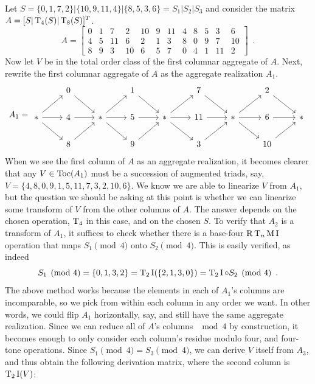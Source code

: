 \begin{example}
    \cite[224]{Starr1984}
    Let $S = \{ 0, 1, 7, 2 \} | \{ 10, 9, 11, 4 \} | \{ 8, 5, 3, 6 \} = S_1 | S_2 | S_3$ and consider the matrix $A = [S | \operatorname{T}_4(S) | \operatorname{T}_8(S)]^T$.
    \begin{equation}
        A = \left[
        \begin{array}{cccc|cccc|cccc}
        	0 & 1 & 7 & 2 & 10 & 9 & 11 & 4 & 8 & 5 & 3 & 6 \\
        	4 & 5 & 11 & 6 & 2 & 1 & 3 & 8 & 0 & 9 & 7 & 10 \\
        	8 & 9 & 3 & 10 & 6 & 5 & 7 & 0 & 4 & 1 & 11 & 2
        \end{array}
        \right] \enspace.
    \end{equation}
    Now let $V$ be in the total order class of the first columnar aggregate of $A$. Next, rewrite the first columnar aggregate of $A$ as the aggregate realization $A_1$.
    \begin{equation}
        A_1 = \begin{tikzcd}
            & 0 \arrow[dr] && 1 \arrow[dr] && 7 \arrow[dr] && 2 \arrow[dr] & \\
            * \arrow[r] \arrow[dr] \arrow[ur] & 4 \arrow[r] & * \arrow[r] \arrow[dr] \arrow[ur] & 5 \arrow[r] & * \arrow[r] \arrow[dr] \arrow[ur] & 11 \arrow[r] & * \arrow[r] \arrow[dr] \arrow[ur] & 6 \arrow[r] & * \\
            & 8 \arrow[ur] && 9 \arrow[ur] && 3 \arrow[ur] && 10 \arrow[ur] &
        \end{tikzcd}
    \end{equation}
    When we see the first column of $A$ as an aggregate realization, it becomes clearer that any $V \in \operatorname{Toc}(A_1)$ must be a succession of augmented triads, say, $V = \{ 4, 8, 0, 9, 1, 5, 11, 7, 3, 2, 10, 6 \}$. We know we are able to linearize $V$ from $A_1$, but the question we should be asking at this point is whether we can linearize some transform of $V$ from the other columns of $A$. The answer depends on the chosen operation, $\operatorname{T}_4$ in this case, and on the chosen $S$. To verify that $A_2$ is a transform of $A_1$, it suffices to check whether there is a base-four $\operatorname{R}\operatorname{T}_n\operatorname{M}\operatorname{I}$ operation that maps $S_1 \pmod 4$ onto $S_2 \pmod 4$. This is easily verified, as indeed
    \begin{equation}
        S_1 \pmod 4 = \{ 0, 1, 3, 2 \} = \operatorname{T}_2\operatorname{I}(\{ 2, 1, 3, 0 \}) = \operatorname{T}_2\operatorname{I} \circ S_2 \pmod 4 \enspace.
    \end{equation}
    The above method works because the elements in each of $A_1$'s columns are incomparable, so we pick from within each column in any order we want. In other words, we could flip $A_1$ horizontally, say, and still have the same aggregate realization. Since we can reduce all of $A$'s columns $\mod 4$ by construction, it becomes enough to only consider each column's residue modulo four, and four-tone operations. Since $S_1 \pmod 4 = S_3 \pmod 4$, we can derive $V$ itself from $A_3$, and thus obtain the following derivation matrix, where the second column is $\operatorname{T}_2\operatorname{I}(V)$:

\end{example}
